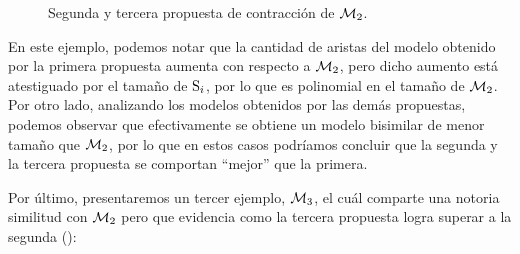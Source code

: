 \begin{figure}[h]
    \hspace{1.05cm}
    \vspace{0.4cm}
    \hspace{1.8cm}
    \caption{Segunda y tercera propuesta de contracción de $\modults_2$.}
    \label{fig:2nd-example-2nd-3rd-contraction}
\end{figure}

En este ejemplo, podemos notar que la cantidad de aristas del modelo obtenido por la primera propuesta aumenta con respecto 
a $\modults_2$, pero dicho aumento está atestiguado por el tamaño de $\S_i$, por lo que es polinomial en el tamaño de $\modults_2$. 
Por otro lado, analizando los modelos obtenidos por las demás propuestas, podemos observar que efectivamente se obtiene un modelo 
bisimilar de menor tamaño que $\modults_2$, por lo que en estos casos podríamos concluir que la segunda y la tercera propuesta se 
comportan ``mejor'' que la primera.


Por último, presentaremos un tercer ejemplo, $\modults_3$, el cuál comparte una notoria similitud con $\modults_2$ pero que evidencia 
como la tercera propuesta logra superar a la segunda ():


